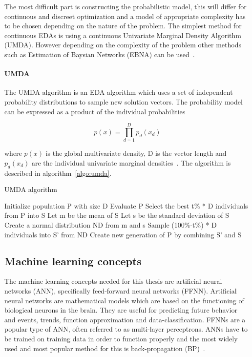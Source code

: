 The most difficult part is constructing the probabilistic model, this will differ for continuous and discreet optimization and a model of appropriate complexity has to be chosen depending on the nature of the problem. The simplest method for continuous EDAs is using a continuous Univariate Marginal Density Algorithm (UMDA). However depending on the complexity of the problem other methods such as Estimation of Baysian Networks (EBNA) can be used~\cite{larranaga2012review}.

\paragraph{UMDA}
The UMDA algorithm is an EDA algorithm which uses a set of independent probability distributions to sample new solution vectors. The probability model can be expressed as a product of the individual probabilities

\begin{equation}
  p(x) = \prod _{d=1}^D {p_d(x_d)}
\end{equation}

where $p(x)$ is the global multivariate density, D is the vector length and $p_d(x_d)$ are the individual univariate marginal densities~\cite{povsik2004estimation}. The algorithm is described in algorithm~\ref{algo:umda}.

\begin{algorithm}[h]
  \caption{UMDA algorithm}
  \label{algo:umda}

    \begin{algorithmic}
      \State Initialize population P with size D
      \Repeat
        \State Evaluate P
        \State Select the best t\% * D individuals from P into S
        \State Let m be the mean of S
        \State Let s be the standard deviation of S
        \State Create a normal distribution ND from m and s
        \State Sample (100\%-t\%) * D individuals into S' from ND
        \State Create new generation of P by combining S' and S
    \end{algorithmic}

\end{algorithm}

\subsection{Machine learning concepts}

The machine learning concepts needed for this thesis are artificial neural networks (ANN), specifically feed-forward neural networks (FFNN). Artificial neural networks are mathematical models which are based on the functioning of biological neurons in the brain. They are useful for predicting future behavior and events, trends, function approximation and data-classification. FFNNs are a popular type of ANN, often referred to as multi-layer perceptrons.  ANNs have to be trained on training data in order to function properly and the most widely used and most popular method for this is back-propagation (BP)~\cite{gardner1998artificial}.

